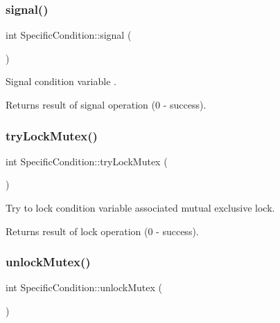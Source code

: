\subsubsection{\texorpdfstring{signal()}{signal()}}
{\footnotesize\ttfamily int Specific\+Condition\+::signal (\begin{DoxyParamCaption}{ }\end{DoxyParamCaption})\hspace{0.3cm}{\ttfamily [inline]}}

Signal condition variable . \begin{DoxyReturn}{Returns}
result of signal operation (0 -\/ success). 
\end{DoxyReturn}
\mbox{\label{classSpecificCondition_a408f84395e536d0e9ae0604e7ac3feb1}} 
\subsubsection{\texorpdfstring{try\+Lock\+Mutex()}{tryLockMutex()}}
{\footnotesize\ttfamily int Specific\+Condition\+::try\+Lock\+Mutex (\begin{DoxyParamCaption}{ }\end{DoxyParamCaption})\hspace{0.3cm}{\ttfamily [inline]}}

Try to lock condition variable associated mutual exclusive lock. \begin{DoxyReturn}{Returns}
result of lock operation (0 -\/ success). 
\end{DoxyReturn}
\mbox{\label{classSpecificCondition_a8cdac09a54f900329b35a54349cbba44}} 
\subsubsection{\texorpdfstring{unlock\+Mutex()}{unlockMutex()}}
{\footnotesize\ttfamily int Specific\+Condition\+::unlock\+Mutex (\begin{DoxyParamCaption}{ }\end{DoxyParamCaption})\hspace{0.3cm}{\ttfamily [inline]}}

